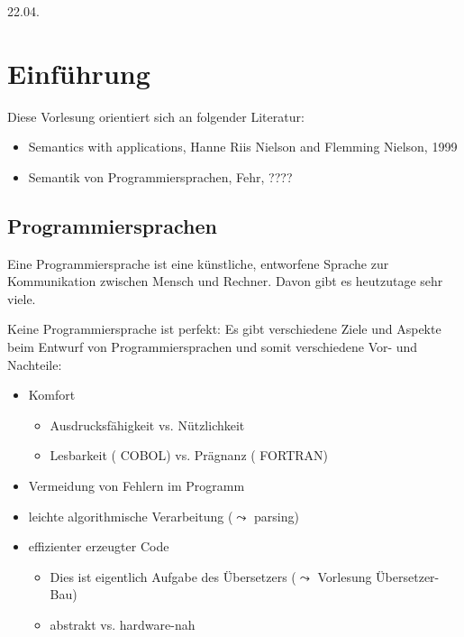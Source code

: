 \newpage
\hfill 22.04.

\section{Einführung}

Diese Vorlesung orientiert sich an folgender Literatur:
\begin{itemize}
    \item Semantics with applications, Hanne Riis Nielson and Flemming Nielson, 1999
    \item Semantik von Programmiersprachen, Fehr, ????
\end{itemize}



\subsection{Programmiersprachen}

Eine Programmiersprache ist eine künstliche, entworfene Sprache zur Kommunikation zwischen Mensch und Rechner. Davon gibt es heutzutage sehr viele.

Keine Programmiersprache ist perfekt: Es gibt verschiedene Ziele und Aspekte beim Entwurf von Programmiersprachen und somit verschiedene Vor- und Nachteile:
\begin{itemize}
    \item Komfort
    \begin{itemize}
        \item Ausdrucksfähigkeit vs. Nützlichkeit
        \item Lesbarkeit (\zb{} COBOL) vs. Prägnanz (\zb{} FORTRAN)
    \end{itemize}
    \item Vermeidung von Fehlern im Programm
    \item leichte algorithmische Verarbeitung ($\leadsto$ parsing)
    \item effizienter erzeugter Code
    \begin{itemize}
        \item Dies ist eigentlich Aufgabe des Übersetzers ($\leadsto$ Vorlesung Übersetzer-Bau)
        \item abstrakt vs. hardware-nah
    \end{itemize}
\end{itemize}


